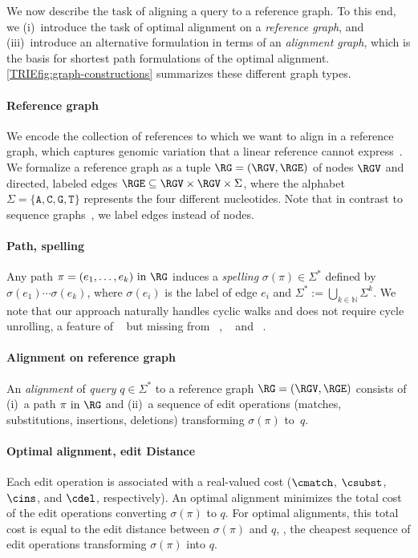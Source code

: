 We now describe the task of aligning a query to a reference graph. To this end,
we (i)~introduce the task of optimal alignment on a \emph{reference graph}, and
(iii)~introduce an alternative formulation in terms of an \emph{alignment
graph}, which is the basis for shortest path formulations of the optimal
alignment.
%
\cref{TRIEfig:graph-constructions} summarizes these different graph types.

\paragraph{Reference graph}
We encode the collection of references to which we want to align in a reference
graph, which captures genomic variation that a linear reference cannot
express~\cite{paten_genome_2017,garrison_variation_2018}.
%
We formalize a reference graph as a tuple $\RG=(\RGV,\RGE)$ of nodes $\RGV$ and
directed, labeled edges $\RGE \subseteq \RGV \times \RGV \times \Sigma$, where
the alphabet $\Sigma=\{\texttt{A},\texttt{C},\texttt{G},\texttt{T}\}$ represents
the four different nucleotides.
%
Note that in contrast to sequence graphs~\cite{rautiainen_aligning_2017}, we
label edges instead of nodes.

\paragraph{Path, spelling}
Any path $\pi=(e_1,\dots,e_k) \text { in } \RG$ induces a \emph{spelling}
$\sigma(\pi) \in \Sigma^*$ defined by $\sigma(e_1)\cdots\sigma(e_k)$, where
$\sigma(e_i)$ is the label of edge $e_i$ and $\Sigma^* := \bigcup_{k \in
\mathbb{N}} \Sigma^k$. We note that our approach naturally handles cyclic walks
and does not require cycle unrolling, a feature of
\bitparallel~\cite{rautiainen_bitparallel_2019} but missing from
\vg~\cite{garrison_variation_2018}, \pasgal~\cite{jain_accelerating_2019} and
\valigntool~\cite{kavya_sequence_2019}.

\paragraph{Alignment on reference graph}
An \emph{alignment} of \emph{query} $q \in \Sigma^*$ to a reference graph
$\RG=(\RGV,\RGE)$ consists of (i)~a path $\pi \text{ in } \RG$ and (ii)~a
sequence of edit operations (matches, substitutions, insertions, deletions)
transforming $\sigma(\pi)$ to~$q$.

\paragraph{Optimal alignment, edit Distance}
Each edit operation is associated with a real-valued cost ($\cmatch$, $\csubst$,
$\cins$, and $\cdel$, respectively).
An optimal alignment minimizes the total cost of the edit operations converting
$\sigma(\pi)$ to $q$. For optimal alignments, this total cost is equal to the
edit distance between $\sigma(\pi)$ and $q$, \ie, the cheapest sequence of edit
operations transforming $\sigma(\pi)$ into $q$.

